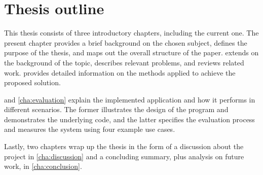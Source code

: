 \section{Thesis outline}
This thesis consists of three introductory chapters, including the current one. The present chapter provides a brief background on the chosen subject, defines the purpose of the thesis, and maps out the overall structure of the paper.  extends on the background of the topic, describes relevant problems, and reviews related work.  provides detailed information on the methods applied to achieve the proposed solution.

 and \cref{cha:evaluation} explain the implemented application and how it performs in different scenarios. The former illustrates the design of the program and demonstrates the underlying code, and the latter specifies the evaluation process and measures the system using four example use cases.

Lastly, two chapters wrap up the thesis in the form of a discussion about the project in \cref{cha:discussion} and a concluding summary, plus analysis on future work, in \cref{cha:conclusion}.

\egroup{}